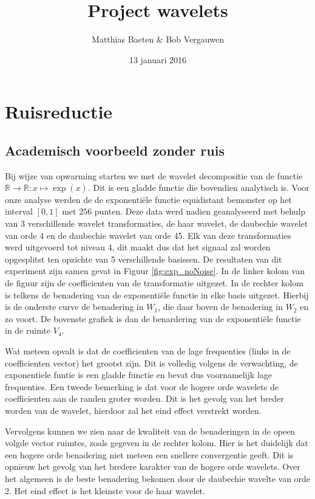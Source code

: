 

\title{Project wavelets}
\author{Matthias Baeten \& Bob Vergauwen}
\date{ 13 januari 2016}



\maketitle

\section{Ruisreductie}

\subsection{Academisch voorbeeld zonder ruis}

Bij wijze van opwarming starten we met de wavelet decompositie van de functie $ \mathbb{R}  \to \mathbb{R}: x \mapsto \exp(x)$. 
Dit is een gladde functie die bovendien analytisch is. 
Voor onze analyse werden de de exponenti\"ele functie equidistant bemonster op het interval $ [0,1] $ met $ 256 $ punten.
Deze data werd nadien geanalyseerd met behulp van 3 verschillende wavelet transformaties, de haar wavelet, de daubechie wavelet van orde 4 en de daubechie wavelet van orde 45.
Elk van deze transformaties werd uitgevoerd tot niveau 4, dit maakt dus dat het signaal zal worden opgesplitst ten opzichte van 5 verschillende basissen.  
De resultaten van dit experiment zijn samen gevat in Figuur \ref{fig:exp_noNoise}.
In de linker kolom van de figuur zijn de coefficienten van de transformatie uitgezet.
In de rechter kolom is telkens de benadering van de exponenti\"ele functie in elke basis uitgezet.
Hierbij is de onderste curve de benadering in $ W_1 $, die daar boven de benadering in $ W_2 $ en zo voort.
De bovenste grafiek is dan de benardering van de exponenti\"ele functie in de ruimte $ V_4 $.

Wat meteen opvalt is dat de coefficienten van de lage frequenties (links in de coefficienten vector) het grootst zijn.
Dit is volledig volgens de verwachting, de exponentiele funtie is een gladde functie en bevat dus voornamelijk lage frequenties.
Een tweede bemerking is dat voor de hogere orde wavelets de coefficienten aan de randen groter worden.
Dit is het gevolg van het breder worden van de wavelet, hierdoor zal het eind effect verstrekt worden.

Vervolgens kunnen we zien naar de kwaliteit van de benaderingen in de opeen volgde vector ruimtes, zoals gegeven in de rechter kolom.
Hier is het duidelijk dat een hogere orde benadering niet meteen een snellere convergentie geeft.
Dit is opnieuw het gevolg van het bredere karakter van de hogere orde wavelets.
Over het algemeen is de beste benadering bekomen door de daubechie wavelte van orde 2.
Het eind effect is het kleinste voor de haar wavelet.

